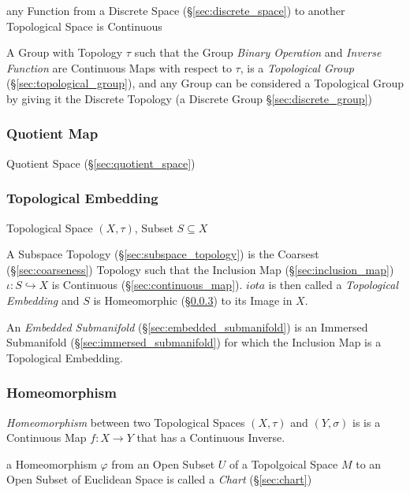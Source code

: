 any Function from a Discrete Space (\S\ref{sec:discrete_space}) to another
Topological Space is Continuous

A Group with Topology $\tau$ such that the Group \emph{Binary Operation} and
\emph{Inverse Function} are Continuous Maps with respect to $\tau$, is a
\emph{Topological Group} (\S\ref{sec:topological_group}), and any Group can be
considered a Topological Group by giving it the Discrete Topology (a Discrete
Group \S\ref{sec:discrete_group})



\subsubsection{Quotient Map}\label{sec:quotient_map}

Quotient Space (\S\ref{sec:quotient_space})



\subsubsection{Topological Embedding}\label{sec:topological_embedding}

Topological Space $(X,\tau)$, Subset $S \subseteq X$

A Subspace Topology (\S\ref{sec:subspace_topology}) is the Coarsest
(\S\ref{sec:coarseness}) Topology such that the Inclusion Map
(\S\ref{sec:inclusion_map}) $\iota : S \hookrightarrow X$ is
Continuous (\S\ref{sec:continuous_map}). $iota$ is then called a
\emph{Topological Embedding} and $S$ is Homeomorphic
(\S\ref{sec:homeomorphism}) to its Image in $X$.

An \emph{Embedded Submanifold} (\S\ref{sec:embedded_submanifold}) is an
Immersed Submanifold (\S\ref{sec:immersed_submanifold}) for which the Inclusion
Map is a Topological Embedding.



\subsubsection{Homeomorphism}\label{sec:homeomorphism}

\emph{Homeomorphism} between two Topological Spaces $(X, \tau)$ and
$(Y, \sigma)$ is is a Continuous Map $f : X \rightarrow Y$ that has a
Continuous Inverse.

a Homeomorphism $\varphi$ from an Open Subset $U$ of a Topolgoical Space $M$ to
an Open Subset of Euclidean Space is called a \emph{Chart} (\S\ref{sec:chart})



